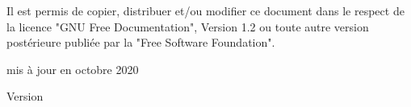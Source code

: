 {\begin{titlepage}
    Il est permis de copier, distribuer et/ou modifier ce document dans le respect de la licence "GNU Free Documentation", Version 1.2 ou toute autre version postérieure publiée par la "Free Software Foundation".

    mis à jour en octobre 2020
    \end{titlepage}
    \pagestyle{headings}
    \clearemptydoublepage \pagestyle{headings}
}{%
    \begin{titlepage}
        \large{Version \DocVersion}
    \end{titlepage}
    \clearemptydoublepage \pagestyle{headings}
    \clearemptydoublepage {}
}
\makeatother
